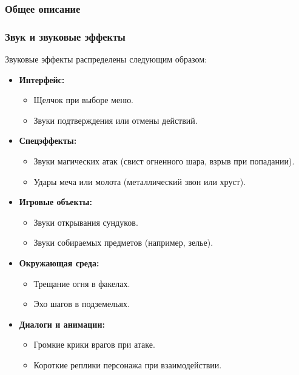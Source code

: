 \documentclass{article}
\begin{document}
\subsubsection{Общее описание}
\subsubsection{Звук и звуковые эффекты}
Звуковые эффекты распределены следующим образом:
\begin{itemize}
    \item \textbf{Интерфейс:}
    \begin{itemize}
        \item Щелчок при выборе меню.
        \item Звуки подтверждения или отмены действий.
    \end{itemize}
    \item \textbf{Спецэффекты:}
    \begin{itemize}
        \item Звуки магических атак (свист огненного шара, взрыв при попадании).
        \item Удары меча или молота (металлический звон или хруст).
    \end{itemize}
    \item \textbf{Игровые объекты:}
    \begin{itemize}
        \item Звуки открывания сундуков.
        \item Звуки собираемых предметов (например, зелье).
    \end{itemize}
    \item \textbf{Окружающая среда:}
    \begin{itemize}
        \item Трещание огня в факелах.
        \item Эхо шагов в подземельях.
    \end{itemize}
    \item \textbf{Диалоги и анимации:}
    \begin{itemize}
        \item Громкие крики врагов при атаке.
        \item Короткие реплики персонажа при взаимодействии.
    \end{itemize}
\end{itemize}
\end{document}
